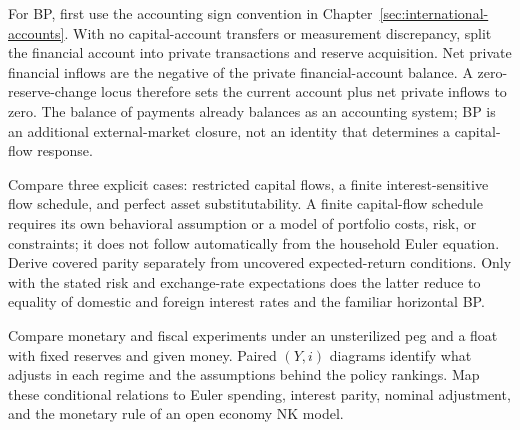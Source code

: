For BP, first use the accounting sign convention in
Chapter~\ref{sec:international-accounts}. With no capital-account transfers or
measurement discrepancy, split the financial account into private transactions
and reserve acquisition. Net private financial inflows are the negative of the
private financial-account balance. A zero-reserve-change locus therefore sets
the current account plus net private inflows to zero. The balance of payments
already balances as an accounting system; BP is an additional external-market
closure, not an identity that determines a capital-flow response.

Compare three explicit cases: restricted capital flows, a finite interest-sensitive
flow schedule, and perfect asset substitutability. A finite capital-flow schedule
requires its own behavioral assumption or a model of portfolio costs, risk, or
constraints; it does not follow automatically from the household Euler equation.
Derive covered parity separately from uncovered expected-return conditions.
Only with the stated risk and exchange-rate expectations does the latter reduce
to equality of domestic and foreign interest rates and the familiar horizontal BP.

Compare monetary and fiscal experiments under an unsterilized peg and a float
with fixed reserves and given money. Paired $(Y,i)$ diagrams identify what
adjusts in each regime and the assumptions behind the policy rankings. Map
these conditional relations to Euler spending, interest parity, nominal
adjustment, and the monetary rule of an open economy NK model.
